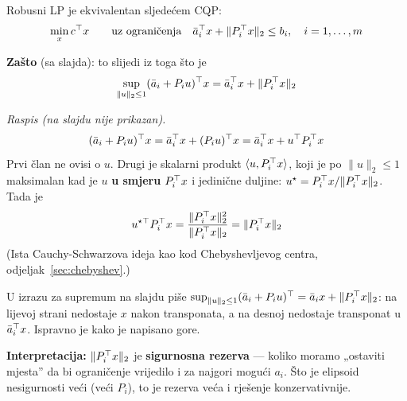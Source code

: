 \begin{teorem}
Robusni LP je ekvivalentan sljedećem CQP:
\begin{equation}
\label{eq:robusni-lp-cqp}
\min_x c\T x \qquad \uzogr
\bar a_i\T x + \|P_i\T x\|_2 \le b_i, \quad i = 1,\dots,m
\end{equation}
\end{teorem}

\textbf{Zašto} (sa slajda): to slijedi iz toga što je
\[
\sup_{\|u\|_2 \le 1}(\bar a_i + P_iu)\T x
= \bar a_i\T x + \|P_i\T x\|_2
\]

\emph{Raspis (na slajdu nije prikazan).}
\[
(\bar a_i + P_iu)\T x = \bar a_i\T x + (P_iu)\T x
= \bar a_i\T x + u\T P_i\T x
\]
Prvi član ne ovisi o $u$. Drugi je skalarni produkt $\langle u, P_i\T x\rangle$,
koji je po $\|u\|_2 \le 1$ maksimalan kad je $u$ \textbf{u smjeru} $P_i\T x$ i
jedinične duljine: $u^\star = P_i\T x/\|P_i\T x\|_2$. Tada je
\[
u^{\star\top}P_i\T x = \frac{\|P_i\T x\|_2^2}{\|P_i\T x\|_2} = \|P_i\T x\|_2
\]
\checkmark (Ista Cauchy-Schwarzova ideja kao kod Chebyshevljevog centra,
odjeljak~\ref{sec:chebyshev}.)

\begin{napomena}
U izrazu za supremum na slajdu piše
$\sup_{\|u\|_2\le1}(\bar a_i + P_iu)\T = \bar a_ix + \|P_i\T x\|_2$: na lijevoj
strani nedostaje $x$ nakon transponata, a na desnoj nedostaje transponat u
$\bar a_i\T x$. Ispravno je kako je napisano gore.
\end{napomena}

\textbf{Interpretacija:} $\|P_i\T x\|_2$ je \textbf{sigurnosna rezerva} ---
koliko moramo „ostaviti mjesta” da bi ograničenje vrijedilo i za najgori
mogući $a_i$. Što je elipsoid nesigurnosti veći (veći $P_i$), to je rezerva
veća i rješenje konzervativnije.

